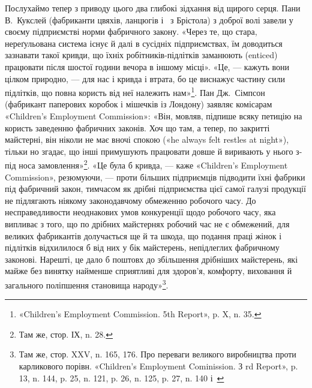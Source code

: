 \parcont{}  %
Послухаймо тепер з приводу цього два глибокі зідхання від щирого серця. Пани
В.~Кукслей (фабриканти цвяхів, ланцюгів і~ з Брістола) з доброї волі
завели у своєму підприємстві норми фабричного
закону. «Через те, що стара, нереґульована система існує й далі в сусідніх
підприємствах, їм доводиться зазнавати такої кривди, що їхніх
робітників-підлітків заманюють (enticed) працювати після
шостої години вечора в іншому місці». «Це, — кажуть вони цілком природно, — для
нас і кривда і втрата, бо це виснажує частину сили підлітків, що повна користь
від неї належить нам»\footnote{
«Children's Employment Commission. 5th Report», p. X, n. 35.
}. Пан Дж.~Сімпсон (фабрикант паперових коробок і мішечків із Лондону) заявляє
комісарам «Children’s Employment Commission»: «Він, мовляв, підпише всяку
петицію на користь заведенню фабричних законів. Хоч що там,
а тепер, по закритті майстерні, він ніколи не має вночі спокою («he always felt
restles at night»), тільки но згадає, що інші примушують працювати довше й
виривають у нього з-під носа замовлення»\footnote{
Там же, стор. ІХ, n. 28.
}.
«Це була б кривда, — каже «Children’s Employment Commission», резюмуючи, —
проти більших підприємців підводити їхні фабрики під фабричний закон, тимчасом
як дрібні підприємства цієї самої галузі
продукції не підлягають ніякому законодавчому обмеженню робочого часу. До
несправедливости неоднакових умов конкуренції щодо робочого часу, яка випливає
з того, що по дрібних майстернях робочий час не є обмежений, для великих
фабрикантів долучається ще й та шкода, що подання праці
жінок і підлітків відхилилося б від них у бік майстерень, непідлеглих
фабричному законові. Нарешті, це дало б поштовх до збільшення дрібніших
майстерень, які майже без винятку найменше сприятливі для
здоров’я, комфорту, виховання й загального поліпшення становища народу»\footnote{
Там же, стор. XXV, n. 165, 176. Про переваги великого виробництва проти
карликового порівн. «Children’s Employment Cominission. З rd Report», p. 13,
n. 144, p. 25, n. 121, p. 26, n. 125, p. 27, n. 140 і~
}.

